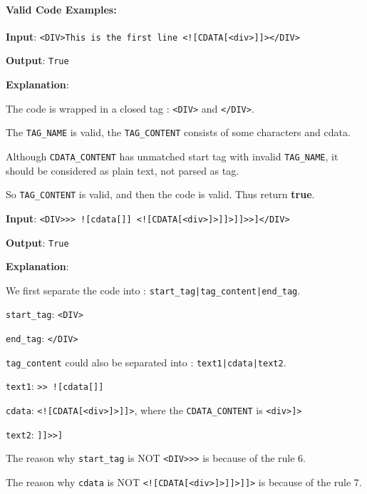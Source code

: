 \paragraph{Valid Code Examples:}

\begin{flushleft}
\textbf{Input}: \texttt{<DIV>This is the first line <![CDATA[<div>]]></DIV>}

\textbf{Output}: \texttt{True}

\textbf{Explanation}: 

The code is wrapped in a closed tag : \texttt{<DIV>} and \texttt{</DIV>}. 

The \texttt{TAG\_NAME} is valid, the \texttt{TAG\_CONTENT} consists of some characters and cdata. 

Although \texttt{CDATA\_CONTENT} has unmatched start tag with invalid \texttt{TAG\_NAME}, it should be considered as plain text, not parsed as tag.

So \texttt{TAG\_CONTENT} is valid, and then the code is valid. Thus return \textbf{true}.


\textbf{Input}: \texttt{<DIV>>>  ![cdata[]] <![CDATA[<div>]>]]>]]>>]</DIV>}

\textbf{Output}: \texttt{True}

\textbf{Explanation}:

We first separate the code into : \texttt{start\_tag|tag\_content|end\_tag}.

\texttt{start\_tag}: \texttt{<DIV>}

\texttt{end\_tag}: \texttt{</DIV>}

\texttt{tag\_content} could also be separated into : \texttt{text1|cdata|text2}.

\texttt{text1}: \texttt{>>  ![cdata[]]}

\texttt{cdata}: \texttt{<![CDATA[<div>]>]]>}, where the \texttt{CDATA\_CONTENT} is \texttt{<div>]>}

\texttt{text2}: \texttt{]]>>]}

The reason why \texttt{start\_tag} is NOT \texttt{<DIV>>>} is because of the rule 6.

The reason why \texttt{cdata} is NOT \texttt{<![CDATA[<div>]>]]>]]>} is because of the rule 7.
\end{flushleft}

%
%
%
%
%

